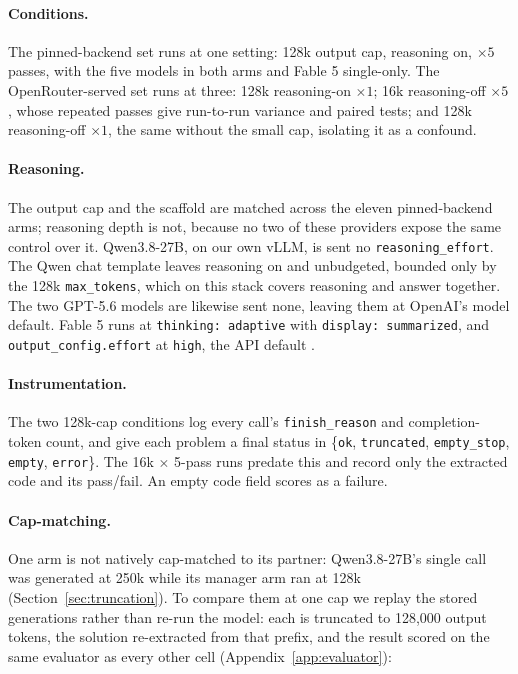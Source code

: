 \documentclass{article}
\begin{document}
\paragraph{Conditions.} The pinned-backend set runs at one setting: 128k output cap, reasoning on,
$\times 5$ passes, with the five models in both arms and Fable 5 single-only. The
OpenRouter-served set runs at three: 128k reasoning-on $\times 1$; 16k reasoning-off
$\times 5$, whose repeated passes give run-to-run variance and paired tests; and 128k reasoning-off
$\times 1$, the same without the small cap, isolating it as a confound.

\paragraph{Reasoning.} The output cap and the scaffold are matched across the eleven pinned-backend
arms; reasoning depth is not, because no two of these providers expose the same control over it.
Qwen3.8-27B, on our own vLLM, is sent no \texttt{reasoning\_effort}. The Qwen chat template
leaves reasoning on and unbudgeted, bounded only by the 128k \texttt{max\_tokens}, which on this
stack covers reasoning and answer together. The two GPT-5.6 models are likewise sent none, leaving
them at OpenAI's model default. Fable 5 runs at \texttt{thinking: adaptive} with \texttt{display:
summarized}, and \texttt{output\_config.effort} at \texttt{high}, the API default
\citep{anthropic2026effort}.

\paragraph{Instrumentation.} The two 128k-cap conditions log every call's \texttt{finish\_reason}
and completion-token count, and give each problem a final status in \{\texttt{ok},
\texttt{truncated}, \texttt{empty\_stop}, \texttt{empty}, \texttt{error}\}. The 16k $\times$ 5-pass
runs predate this and record only the extracted code and its pass/fail. An empty code field scores
as a failure.

\paragraph{Cap-matching.} One arm is not natively cap-matched to its partner: Qwen3.8-27B's single
call was generated at 250k while its manager arm ran at 128k (Section~\ref{sec:truncation}). To
compare them at one cap we replay the stored generations rather than re-run the model: each is
truncated to 128,000 output tokens, the solution re-extracted from that prefix, and the result
scored on the same evaluator as every other cell (Appendix~\ref{app:evaluator}): 
\end{document}
